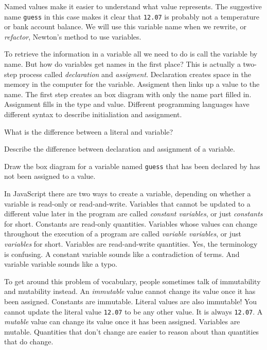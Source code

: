Named values make it easier to understand what value represents. The suggestive
name \texttt{guess} in this case makes it clear that \texttt{12.07} is probably
not a temperature or bank account balance. We will use this variable name when
we rewrite, or \emph{refactor}, Newton's method to use variables.

To retrieve the information in a variable all we need to do is call the variable
by name. But how do variables get names in the first place? This is actually a
two-step process called \emph{declaration} and \emph{assigment}. Declaration
creates space in the memory in the computer for the variable. Assigment then
links up a value to the name. The first step creates an box diagram with only
the name part filled in. Assignment fills in the type and value. Different
programming languages have different syntax to describe initialiation and
assignment.

\begin{question}
  What is the difference between a literal and variable?
\end{question}

\begin{question}
  Describe the difference between declaration and assignment of a variable.
\end{question}

\begin{question}
Draw the box diagram for a variable named \texttt{guess} that has been declared
by has not been assigned to a value.
\end{question}

In JavaScript there are two ways to create a variable, depending on whether a
variable is read-only or read-and-write. Variables that cannot be updated to a
different value later in the program are called \emph{constant variables}, or
just \emph{constants} for short. Constants are read-only quantities. Variables
whose values can change throughout the execution of a program are called
\emph{variable variables}, or just \emph{variables} for short. Variables are
read-and-write quantities. Yes, the terminology is confusing. A constant
variable sounds like a contradiction of terms. And variable variable sounds like
a typo.

To get around this problem of vocabulary, people sometimes talk of immutability
and mutability instead. An \emph{immutable} value cannot change its value once
it has been assigned. Constants are immutable. Literal values are also
immutable! You cannot update the literal value \texttt{12.07} to be any other
value. It is always \texttt{12.07}. A \emph{mutable} value can change its value
once it has been assigned. Variables are mutable. Quantities that don't change
are easier to reason about than quantities that do change.

